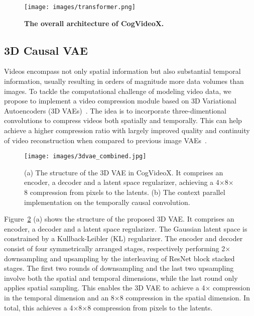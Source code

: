 \documentclass{article} \usepackage{iclr2024_conference,times}
\newcommand{\model}{CogVideoX\xspace}
\begin{document}
\begin{figure}[h]
\begin{center}
\texttt{[image: images/transformer.png]}
\end{center}
\caption{\textbf{The overall architecture of \model.} }
\label{fig:model}
\end{figure}



\subsection{3D Causal VAE} 



Videos encompass not only spatial information but also substantial temporal information, usually resulting in orders of magnitude more data volumes than images.  
To tackle the computational challenge of modeling video data, we propose to implement a video compression module based on 3D Variational Autoencoders (3D VAEs)~\cite{yu2023language}.
The idea is to incorporate three-dimentional convolutions to compress videos both spatially and temporally. 
This can help achieve a higher compression ratio with largely improved quality and continuity of video reconstruction when compared to previous image VAEs~\cite{rombach2022high, esser2021taming}. 
\begin{figure}[h]
\begin{center}
\texttt{[image: images/3dvae\_combined.jpg]}
\end{center}
\caption{(a) The structure of the 3D VAE in \model. It comprises an encoder, a decoder and a latent space regularizer, achieving a 4$\times$8$\times$8 compression from pixels to the latents. (b) The context parallel implementation on the temporally causal convolution.}
\label{fig:3dvae_combined}
\end{figure}

Figure~\ref{fig:3dvae_combined} (a) shows the structure of the proposed 3D VAE. 
It comprises an encoder, a decoder and a latent space regularizer. 
The Gaussian latent space is constrained by a Kullback-Leibler (KL) regularizer.
The encoder and decoder consist of four symmetrically arranged stages, respectively performing 2$\times$ downsampling and upsampling by the interleaving of ResNet block stacked stages. 
The first two rounds of downsampling and the last two upsampling involve both the spatial and temporal dimensions, while the last round only applies spatial sampling. 
This enables the 3D VAE to achieve a 4$\times$ compression in the temporal dimension and an 8$\times$8 compression in the spatial dimension. 
In total, this achieves a 4$\times$8$\times$8 compression from pixels to the latents. 
\end{document}
